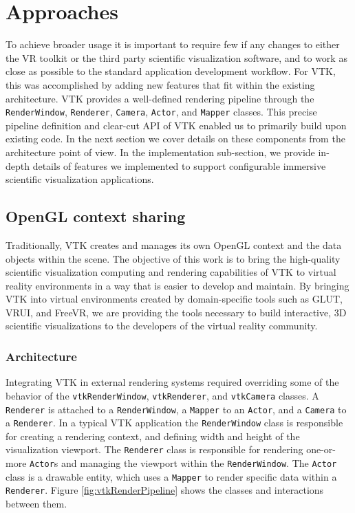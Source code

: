 \section{Approaches}

To achieve broader usage it is important to require few if any changes to either the VR toolkit or the third party scientific visualization software, and to work as close as possible to the standard application development workflow.
For VTK, this was accomplished by adding new features that fit within the existing architecture. 
VTK provides a well-defined rendering pipeline through the \texttt{RenderWindow}, \texttt{Renderer}, \texttt{Camera}, \texttt{Actor}, and \texttt{Mapper} classes.
This precise pipeline definition and clear-cut API of VTK enabled us to primarily build upon
existing code.
In the next section we cover details on these components from the architecture point of view.
In the implementation sub-section, we provide in-depth details of features we implemented to support configurable immersive scientific visualization applications. 

\subsection{OpenGL context sharing}

Traditionally, VTK creates and manages its own OpenGL context and the data objects within the scene.
The objective of this work is to bring the high-quality scientific visualization computing and rendering capabilities of VTK to virtual reality environments in a way that is easier to develop and maintain.
By bringing VTK into virtual environments created by domain-specific tools such as GLUT, VRUI, and FreeVR, we are providing the tools necessary to build interactive, 3D scientific visualizations to the developers of the virtual reality community.

\subsubsection{Architecture}

Integrating VTK in external rendering systems required overriding some of the behavior of the \texttt{vtkRenderWindow}, \texttt{vtkRenderer}, and \texttt{vtkCamera} classes.
A \texttt{Renderer} is attached to a \texttt{RenderWindow}, a \texttt{Mapper} to an \texttt{Actor}, and a \texttt{Camera} to a \texttt{Renderer}.
In a typical VTK application the \texttt{RenderWindow} class is responsible for creating a rendering context, and defining width and height of the visualization viewport.
The \texttt{Renderer} class is responsible for rendering one-or-more
\texttt{Actor}s and managing the viewport within the \texttt{RenderWindow}.
The \texttt{Actor} class is a drawable entity, which uses a \texttt{Mapper} to render specific data within a \texttt{Renderer}.
Figure \ref{fig:vtkRenderPipeline} shows the classes and interactions between them.

